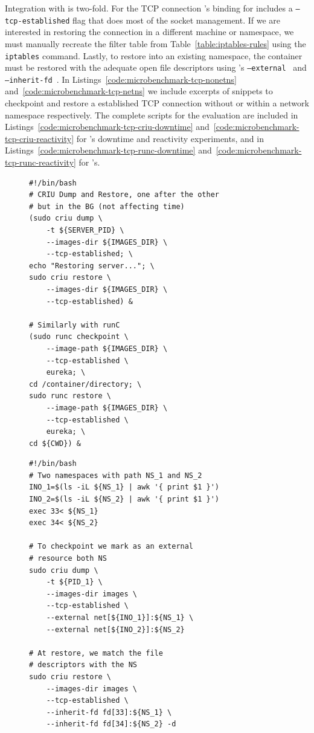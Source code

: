 Integration with \runc is two-fold.
For the TCP connection \criu's binding for \runc includes a \texttt{--tcp-established} flag that does most of the socket management.
If we are interested in restoring the connection in a different machine or namespace, we must manually recreate the filter table from Table~\ref{table:iptables-rules} using the \texttt{iptables} command.
Lastly, to restore into an existing namespace, the container must be restored with the adequate open file descriptors using \criu's \texttt{--external}~\cite{criu-external} and \texttt{--inherit-fd}~\cite{criu-inherit-fd}.
In Listings~\ref{code:microbenchmark-tcp-nonetns} and~\ref{code:microbenchmark-tcp-netns} we include excerpts of snippets to checkpoint and restore a established TCP connection without or within a network namespace respectively.
The complete scripts for the evaluation are included in Listings~\ref{code:microbenchmark-tcp-criu-downtime} and~\ref{code:microbenchmark-tcp-criu-reactivity} for \criu's downtime and reactivity experiments, and in Listings~\ref{code:microbenchmark-tcp-runc-downtime} and~\ref{code:microbenchmark-tcp-runc-reactivity} for \runc's.
\begin{figure}[h!]
\begin{minipage}{.45\textwidth}
\begin{lstlisting}[style=Bash,caption={Checkpoint and restore an established TCP connection using \criu and \runc.\label{code:microbenchmark-tcp-nonetns}}]
#!/bin/bash
# CRIU Dump and Restore, one after the other 
# but in the BG (not affecting time)
(sudo criu dump \
    -t ${SERVER_PID} \
    --images-dir ${IMAGES_DIR} \
    --tcp-established; \
echo "Restoring server..."; \
sudo criu restore \
    --images-dir ${IMAGES_DIR} \
    --tcp-established) &

# Similarly with runC
(sudo runc checkpoint \
    --image-path ${IMAGES_DIR} \
    --tcp-established \
    eureka; \
cd /container/directory; \
sudo runc restore \
    --image-path ${IMAGES_DIR} \
    --tcp-established \
    eureka; \
cd ${CWD}) &
\end{lstlisting}
\end{minipage}\hfill
\begin{minipage}{.45\textwidth}
\begin{lstlisting}[style=Bash,caption={Excerpt of a script to checkpoint a connection within an existing namespace, and inherit it on restore.\label{code:microbenchmark-tcp-netns}}]
#!/bin/bash
# Two namespaces with path NS_1 and NS_2
INO_1=$(ls -iL ${NS_1} | awk '{ print $1 }')
INO_2=$(ls -iL ${NS_2} | awk '{ print $1 }')
exec 33< ${NS_1}
exec 34< ${NS_2}

# To checkpoint we mark as an external
# resource both NS
sudo criu dump \
    -t ${PID_1} \
    --images-dir images \
    --tcp-established \
    --external net[${INO_1}]:${NS_1} \
    --external net[${INO_2}]:${NS_2}

# At restore, we match the file 
# descriptors with the NS
sudo criu restore \
    --images-dir images \
    --tcp-established \
    --inherit-fd fd[33]:${NS_1} \
    --inherit-fd fd[34]:${NS_2} -d
\end{lstlisting}
\end{minipage}
\end{figure}

